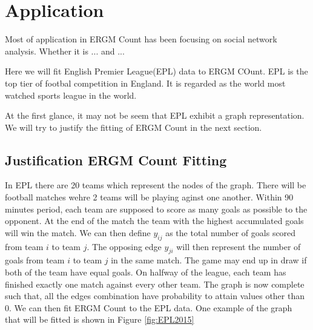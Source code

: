 \documentclass[12pt,a4paper,twoside,openany]{book}
\begin{document}



\chapter{Application}
Most of application in ERGM Count has been focusing on social network analysis. 
Whether it is ... and ... 

Here we will fit English Premier League(EPL) data to ERGM COunt.
EPL is the top tier of footbal competition in England.
It is regarded as the world most watched sports league in the world. 

At the first glance, it may not be seem that EPL exhibit a graph representation. We will try to justify the fitting of ERGM Count in the next section.  

\section{Justification ERGM Count Fitting}

In EPL there are 20 teams which represent the nodes of the graph. There will be football matches wehre 2 teams will be playing aginst one another. 
Within 90 minutes period, each team are supposed to score as many goals as possible to the opponent.
At the end of the match the team with the highest accumulated goals will win the match. 
We can then define $y_{ij}$ as the total number of goals scored from team $i$ to team $j$.
The opposing edge $y_{ji}$ will then represent the number of goals from team $i$ to team $j$ in the same match. 
The game may end up in draw if both of the team have equal goals.
On halfway of the league, each team has finished exactly one match against every other team. 
The graph is now complete such that, all the edges combination have probability to attain values other than 0. 
We can then fit ERGM Count to the EPL data.
One example of the graph that will be fitted is shown in Figure \ref{fig:EPL2015}
\end{document}
